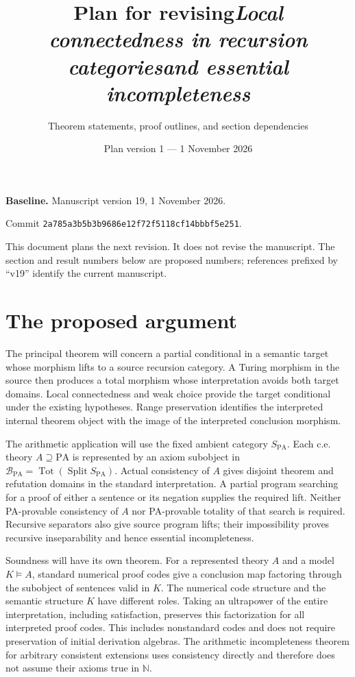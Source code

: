 \documentclass[11pt]{article}
\title{Plan for revising\newline\emph{Local connectedness in recursion categories\newline and essential incompleteness}}
\author{Theorem statements, proof outlines, and section dependencies}
\date{Plan version 1 --- 1 November 2026}
\theoremstyle{definition}\newtheorem{definition}[theorem]{Definition}
\newcommand{\PA}{\mathrm{PA}}
\newcommand{\N}{\mathbb N}
\newcommand{\Tot}{\operatorname{Tot}}
\newcommand{\Split}{\operatorname{Split}}
\newcommand{\B}{\mathcal B}
\begin{document}
\maketitle

\noindent\textbf{Baseline.} Manuscript version 19, 1 November 2026.\par
\noindent Commit \texttt{2a785a3b5b3b9686e12f72f5118cf14bbbf5e251}.\par
This document plans the next revision. It does not revise the manuscript.
The section and result numbers below are proposed numbers; references
prefixed by ``v19'' identify the current manuscript.

\section*{The proposed argument}
The principal theorem will concern a partial conditional in a semantic
target whose morphism lifts to a source recursion category. A Turing
morphism in the source then produces a total morphism whose interpretation
avoids both target domains. Local connectedness and weak choice provide
the target conditional under the existing hypotheses. Range preservation
identifies the interpreted internal theorem object with the image of the
interpreted conclusion morphism.

The arithmetic application will use the fixed ambient category
$S_{\PA}$. Each c.e. theory $A\supseteq\PA$ is represented by an axiom
subobject in $\B_{\PA}=\Tot(\Split S_{\PA})$. Actual consistency of $A$
gives disjoint theorem and refutation domains in the standard
interpretation. A partial program searching for a proof of either a
sentence or its negation supplies the required lift. Neither PA-provable
consistency of $A$ nor PA-provable totality of that search is required.
Recursive separators also give source program lifts; their impossibility
proves recursive inseparability and hence essential incompleteness.

Soundness will have its own theorem. For a represented theory $A$ and
a model $K\models A$, standard numerical proof codes give a conclusion
map factoring through the subobject of sentences valid in $K$.
The numerical code structure and the semantic structure $K$ have
different roles. Taking an ultrapower
of the entire interpretation, including satisfaction, preserves this
factorization for all interpreted proof codes. This includes nonstandard
codes and does not require preservation of initial derivation algebras.
The arithmetic incompleteness theorem for arbitrary consistent extensions
uses consistency directly and therefore does not assume their axioms
true in $\N$.
\end{document}
